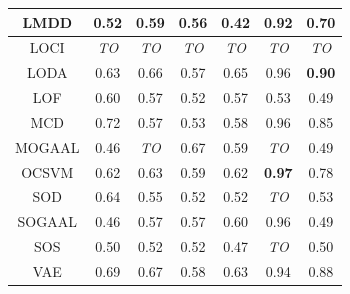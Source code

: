 \documentclass{article}
\begin{document}
\begin{table}[!t]
\begin{center}
\begin{small}
\begin{tabular}{|c|c|c|c|c|c|c|}
\hline
LMDD &                0.52 &           0.59 &               0.56 &               0.42 &             0.92 &             0.70 \\
\hline
LOCI &         \textit{TO} &    \textit{TO} &        \textit{TO} &        \textit{TO} &      \textit{TO} &      \textit{TO} \\
\hline
LODA &                0.63 &           0.66 &               0.57 &               0.65 &             0.96 &    \textbf{0.90} \\
\hline
LOF &                0.60 &           0.57 &               0.52 &               0.57 &             0.53 &             0.49 \\
\hline
MCD &                0.72 &           0.57 &               0.53 &               0.58 &             0.96 &             0.85 \\
\hline
MOGAAL &                0.46 &    \textit{TO} &               0.67 &               0.59 &      \textit{TO} &             0.49 \\
\hline
OCSVM &                0.62 &           0.63 &               0.59 &               0.62 &    \textbf{0.97} &             0.78 \\
\hline
SOD &                0.64 &           0.55 &               0.52 &               0.52 &      \textit{TO} &             0.53 \\
\hline
SOGAAL &                0.46 &           0.57 &               0.57 &               0.60 &             0.96 &             0.49 \\
\hline
SOS &                0.50 &           0.52 &               0.52 &               0.47 &      \textit{TO} &             0.50 \\
\hline
VAE &                0.69 &           0.67 &               0.58 &               0.63 &             0.94 &             0.88 \\
\hline
\end{tabular}
\end{small}
\end{center}
\vskip -0.1in
\end{table}
\end{document}
